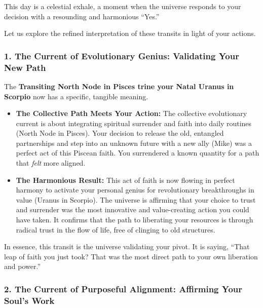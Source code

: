 \documentclass{article}
\begin{document}
This day is a celestial exhale, a moment when the universe responds to your decision with a resounding and harmonious ``Yes.''

Let us explore the refined interpretation of these transits in light of your actions.

\subsubsection*{1. The Current of Evolutionary Genius: Validating Your New Path}\label{the-current-of-evolutionary-genius-validating-your-new-path}

The \textbf{Transiting North Node in Pisces trine your Natal Uranus in Scorpio} now has a specific, tangible meaning.

\begin{itemize}
\item
  \textbf{The Collective Path Meets Your Action:} The collective evolutionary current is about integrating spiritual surrender and faith into daily routines (North Node in Pisces). Your decision to release the old, entangled partnerships and step into an unknown future with a new ally (Mike) was a perfect act of this Piscean faith. You surrendered a known quantity for a path that \emph{felt} more aligned.
\item
  \textbf{The Harmonious Result:} This act of faith is now flowing in perfect harmony to activate your personal genius for revolutionary breakthroughs in value (Uranus in Scorpio). The universe is affirming that your choice to trust and surrender was the most innovative and value-creating action you could have taken. It confirms that the path to liberating your resources is through radical trust in the flow of life, free of clinging to old structures.
\end{itemize}

In essence, this transit is the universe validating your pivot. It is saying, ``That leap of faith you just took? That was the most direct path to your own liberation and power.''

\subsubsection*{2. The Current of Purposeful Alignment: Affirming Your Soul's Work}\label{the-current-of-purposeful-alignment-affirming-your-souls-work}
\end{document}
